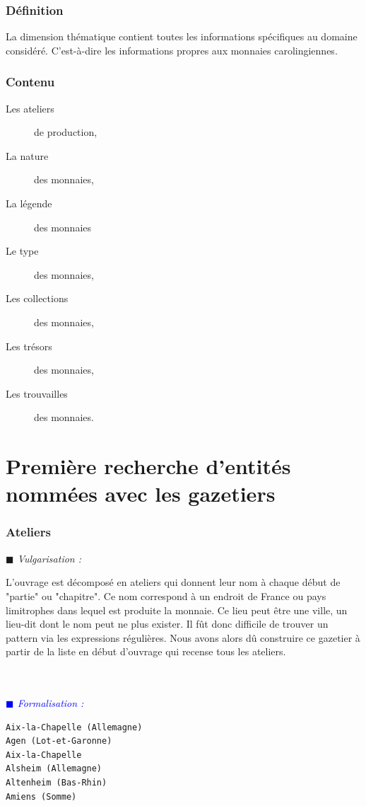 \documentclass[a4paper, 11pt]{report}
\newenvironment{vulgarisation}
    {
    \textit{\textcolor{dark-blue}{$\blacksquare$  Vulgarisation : \\}}

    }
    {
    ~\\~\\
    }
\newenvironment{formalisation}
    {
    \textit{\textcolor{blue}{$\blacksquare$  Formalisation : \\}}
    }
    {
    ~\\~\\
    }
\begin{document}
        \subsubsection{Définition}
    La dimension thématique contient toutes les informations spécifiques au domaine considéré.  C'est-à-dire les informations propres aux monnaies carolingiennes.
    \subsubsection{Contenu} 
    \begin{description}
    \item[Les ateliers] de production,
    \item[La nature] des monnaies,
    \item[La légende] des monnaies
    \item[Le type] des monnaies,
    \item[Les collections] des monnaies,
    \item[Les trésors] des monnaies,
    \item[Les trouvailles] des monnaies.
    \end{description}
    
    
    \section{Première recherche d'entités nommées avec les gazetiers}
    \subsubsection{Ateliers}
\begin{vulgarisation}
    L'ouvrage est décomposé en ateliers qui donnent leur nom à chaque début de "partie" ou "chapitre". Ce nom correspond à un endroit de France ou pays limitrophes dans lequel est produite la monnaie. Ce lieu peut être une ville, un lieu-dit dont le nom peut ne plus exister. Il fût donc difficile de trouver un pattern via les expressions régulières. Nous avons alors dû construire ce gazetier à partir de la liste en début d'ouvrage qui recense tous les ateliers.
\end{vulgarisation}
\begin{formalisation}
\begin{verbatim}
Aix-la-Chapelle (Allemagne)
Agen (Lot-et-Garonne)
Aix-la-Chapelle
Alsheim (Allemagne)
Altenheim (Bas-Rhin)
Amiens (Somme)
\end{verbatim}
\end{formalisation}
\end{document}

